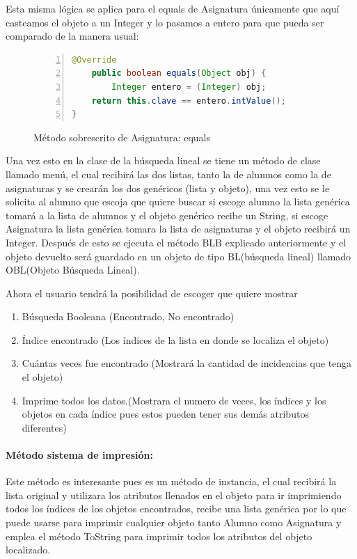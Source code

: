 \documentclass{report}
\begin{document}
Esta misma lógica se aplica para el equals de Asignatura únicamente que aquí casteamos el objeto a un Integer y lo pasamos a entero para que pueda ser comparado de la manera usual:
\begin{figure}[htbp]
\centering
\begin{lstlisting}[language=Java, frame=lines, framesep=2mm, basicstyle=\footnotesize\ttfamily, numbers=left]
    @Override
    public boolean equals(Object obj) {
        Integer entero = (Integer) obj;      
    return this.clave == entero.intValue(); 
}
\end{lstlisting}
\caption{Método sobrescrito de Asignatura: equals}
\end{figure}
Una vez esto en la clase de la búsqueda lineal se tiene un método de clase llamado menú, el cual recibirá las dos listas, tanto la de alumnos como la de asignaturas y se crearán los dos genéricos (lista y objeto), una vez esto se le solicita al alumno que escoja que quiere buscar si escoge alumno la lista genérica tomará a la lista de alumnos y el objeto genérico recibe un String, si escoge Asignatura la lista genérica tomara la lista de asignaturas y el objeto recibirá un Integer.
Después de esto se ejecuta el método BLB explicado anteriormente y el objeto devuelto será guardado en un objeto de tipo BL(búsqueda lineal) llamado OBL(Objeto Búsqueda Lineal).

Ahora el usuario tendrá la posibilidad de escoger que quiere mostrar
\begin{enumerate}
    \item Búsqueda Booleana (Encontrado, No encontrado)
    \item Índice encontrado (Los índices de la lista en donde se localiza el objeto)
    \item Cuántas veces fue encontrado (Mostrará la cantidad de incidencias que tenga el objeto)
    \item Imprime todos los datos.(Mostrara el numero de veces, los índices y los objetos en cada índice pues estos pueden tener sus demás atributos diferentes)
\end{enumerate}
\paragraph{Método sistema de impresión:}
Este método es interesante pues es un método de instancia, el cual recibirá la lista original y utilizara los atributos llenados en el objeto para ir imprimiendo todos los índices de los objetos encontrados, recibe una lista genérica por lo que puede usarse para imprimir cualquier objeto tanto Alumno como Asignatura y emplea el método ToString para imprimir todos los atributos del objeto localizado.
\newpage
\end{document}
